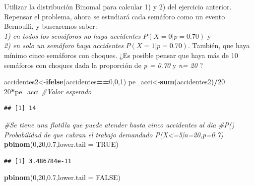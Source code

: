 \documentclass[
]{article}
\newenvironment{Shaded}{\begin{snugshade}}{\end{snugshade}}
\newcommand{\AttributeTok}[1]{\textcolor[rgb]{0.13,0.29,0.53}{#1}}
\newcommand{\CommentTok}[1]{\textcolor[rgb]{0.56,0.35,0.01}{\textit{#1}}}
\newcommand{\ConstantTok}[1]{\textcolor[rgb]{0.56,0.35,0.01}{#1}}
\newcommand{\DecValTok}[1]{\textcolor[rgb]{0.00,0.00,0.81}{#1}}
\newcommand{\FloatTok}[1]{\textcolor[rgb]{0.00,0.00,0.81}{#1}}
\newcommand{\FunctionTok}[1]{\textcolor[rgb]{0.13,0.29,0.53}{\textbf{#1}}}
\newcommand{\NormalTok}[1]{#1}
\newcommand{\OtherTok}[1]{\textcolor[rgb]{0.56,0.35,0.01}{#1}}
\newcommand{\SpecialCharTok}[1]{\textcolor[rgb]{0.81,0.36,0.00}{\textbf{#1}}}
\begin{document}
Utilizar la distribución Binomal para calcular 1) y 2) del ejercicio
anterior. Repensar el problema, ahora se estudiará cada semáforo como un
evento Bernoulli, y buscaremos saber:\\
\emph{1) en todos los semáforos no haya accidentes}
\(P(X =0 | p = 0.70)\) y\\
\emph{2) en solo un semáforo haya accidentes} \(P(X = 1 | p = 0.70)\).
También, que haya mínimo cinco semáforos con choques. ¿Es posible pensar
que haya más de 10 semáforos con choques dada la proporción de \emph{p =
0.70} y \emph{n= 20} ?

\begin{Shaded}
\begin{Highlighting}[]
\NormalTok{accidentes2}\OtherTok{\textless{}{-}}\FunctionTok{ifelse}\NormalTok{(accidentes}\SpecialCharTok{==}\DecValTok{0}\NormalTok{,}\DecValTok{0}\NormalTok{,}\DecValTok{1}\NormalTok{)}
\NormalTok{pe\_acci}\OtherTok{\textless{}{-}}\FunctionTok{sum}\NormalTok{(accidentes2)}\SpecialCharTok{/}\DecValTok{20}
\DecValTok{20}\SpecialCharTok{*}\NormalTok{pe\_acci }\CommentTok{\#Valor esperado}
\end{Highlighting}
\end{Shaded}

\begin{verbatim}
## [1] 14
\end{verbatim}

\begin{Shaded}
\begin{Highlighting}[]
\CommentTok{\#Se tiene una flotilla que puede atender hasta cinco accidentes al día}
\CommentTok{\#P() Probabilidad de que cubran el trabajo demandado P(X\textless{}=5|n=20,p=0.7)}
\FunctionTok{pbinom}\NormalTok{(}\DecValTok{0}\NormalTok{,}\DecValTok{20}\NormalTok{,}\FloatTok{0.7}\NormalTok{,}\AttributeTok{lower.tail =} \ConstantTok{TRUE}\NormalTok{)}
\end{Highlighting}
\end{Shaded}

\begin{verbatim}
## [1] 3.486784e-11
\end{verbatim}

\begin{Shaded}
\begin{Highlighting}[]
\FunctionTok{pbinom}\NormalTok{(}\DecValTok{0}\NormalTok{,}\DecValTok{20}\NormalTok{,}\FloatTok{0.7}\NormalTok{,}\AttributeTok{lower.tail =} \ConstantTok{FALSE}\NormalTok{)}
\end{Highlighting}
\end{Shaded}
\end{document}
